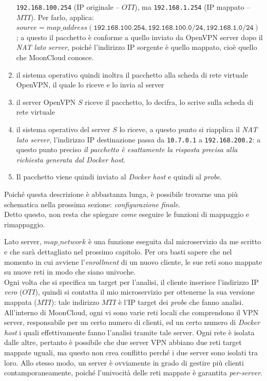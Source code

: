 \begin{enumerate}
  \texttt{192.168.100.254} (IP originale -- $OTI$), ma \texttt{192.168.1.254}
  (IP mappato -- $MTI$). Per farlo, applica:
  $source=map\_address(\texttt{192.168.100.254}, \texttt{192.168.100.0/24},
  \texttt{192.168.1.0/24})$
  ; a questo il pacchetto è conforme a quello inviato da OpenVPN server dopo il
  \textit{NAT lato server}, poiché l'indirizzo IP sorgente è quello mappato, cioè quello
  che MoonCloud conosce.
  \item il sistema operativo quindi inoltra il pacchetto alla scheda di rete virtuale
  OpenVPN, il quale lo riceve e lo invia al server
  \item il server OpenVPN $S$ riceve il pacchetto, lo decifra, lo scrive sulla scheda di rete
  virtuale
  \item il sistema operativo del server $S$ lo riceve, a questo punto si riapplica
  il \textit{NAT lato server}, l'indirizzo IP destinazione passa da \texttt{10.7.0.1}
  a \texttt{192.168.200.2}: a questo punto preciso \textit{il pacchetto è esattamente
  la risposta precisa alla richiesta generata dal Docker host}.
  \item Il pacchetto viene quindi inviato al \textit{Docker host} e quindi al \textit{probe}.
\end{enumerate}
Poiché questa descrizione è abbastanza lunga, è possibile trovarne una più schematica
nella prossima sezione: \textit{configurazione finale}.\\
Detto questo, non resta che spiegare \textit{come} eseguire le funzioni di mappaggio
e rimappaggio.


Lato server, $map\_network$ è una funzione eseguita dal microservizio da me scritto
e che sarà dettagliato nel prossimo capitolo. Per ora basti sapere che nel momento
in cui avviene l'\textit{enrollment} di un nuovo cliente, le sue reti sono mappate
su nuove reti in modo che siano univoche.\\
Ogni volta che si specifica un target per l'analisi, il cliente inserisce l'indirizzo IP
\textit{vero} ($OTI$), quindi si contatta il mio microservizio per ottenerne
la sua versione mappata ($MTI$): tale indirizzo $MTI$ è l'IP target dei \textit{probe}
che fanno analisi.\\
All'interno di MoonCloud, ogni vi sono varie reti locali che comprendono il VPN server,
responsabile per un certo numero di clienti, ed un certo numero di \textit{Docker host}
i quali effettivamente fanno l'analisi tramite tale server. Ogni rete è isolata
dalle altre, pertanto è possibile che due server VPN abbiano due reti target mappate
uguali, ma questo non crea conflitto perché i due server sono isolati tra loro.
Allo stesso modo, un server è ovviamente in grado di gestire più clienti
contamporaneamente, poiché l'univocità delle reti mappate è garantita \textit{per-server}.


